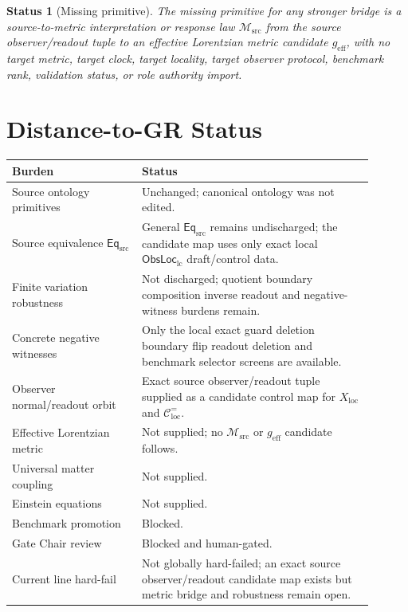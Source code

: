 \documentclass[11pt]{article}
\newcommand{\EqSrc}{\mathsf{Eq}_{\mathrm{src}}}
\newcommand{\ObsLocLC}{\mathsf{ObsLoc}_{\mathrm{lc}}}
\newcommand{\geff}{g_{\mathrm{eff}}}
\newtheorem{status}{Status}
\begin{document}
\begin{status}[Missing primitive]
The missing primitive for any stronger bridge is a source-to-metric
interpretation or response law \(\mathcal{M}_{\mathrm{src}}\) from the
source observer/readout tuple to an effective Lorentzian metric
candidate \(\geff\), with no target metric, target clock, target
locality, target observer protocol, benchmark rank, validation
status, or role authority import.
\end{status}

\section{Distance-to-GR Status}

\begin{center}
\small
\begin{tabular}{p{0.32\linewidth}p{0.58\linewidth}}
\hline
Burden & Status \\
\hline
Source ontology primitives & Unchanged; canonical ontology was not edited. \\
Source equivalence \(\EqSrc\) & General \(\EqSrc\) remains undischarged; the candidate map uses only exact local \(\ObsLocLC\) draft/control data. \\
Finite variation robustness & Not discharged; quotient boundary composition inverse readout and negative-witness burdens remain. \\
Concrete negative witnesses & Only the local exact guard deletion boundary flip readout deletion and benchmark selector screens are available. \\
Observer normal/readout orbit & Exact source observer/readout tuple supplied as a candidate control map for \(X_{\mathrm{loc}}\) and \(\mathcal{C}^{=}_{\mathrm{loc}}\). \\
Effective Lorentzian metric & Not supplied; no \(\mathcal{M}_{\mathrm{src}}\) or \(\geff\) candidate follows. \\
Universal matter coupling & Not supplied. \\
Einstein equations & Not supplied. \\
Benchmark promotion & Blocked. \\
Gate Chair review & Blocked and human-gated. \\
Current line hard-fail & Not globally hard-failed; an exact source observer/readout candidate map exists but metric bridge and robustness remain open. \\
\hline
\end{tabular}
\end{center}
\end{document}
